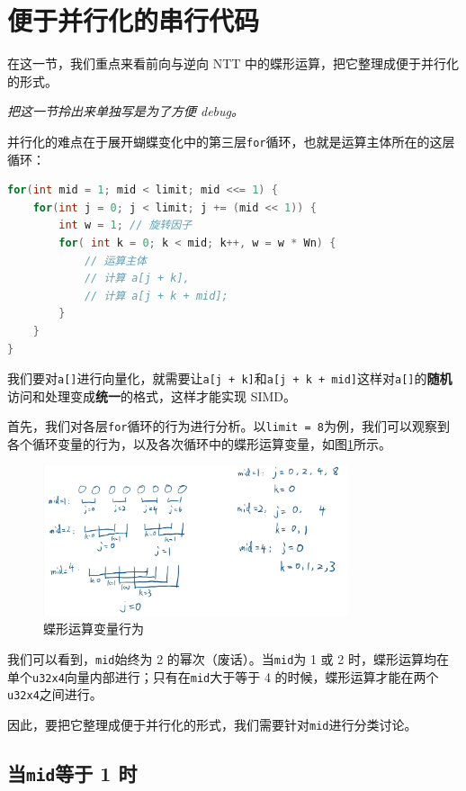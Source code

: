 \documentclass[a4paper]{article}
\begin{document}
\section{便于并行化的串行代码}

在这一节，我们重点来看前向与逆向 NTT 中的蝶形运算，把它整理成便于并行化的形式。

\textit{把这一节拎出来单独写是为了方便 debug。}

并行化的难点在于展开蝴蝶变化中的第三层\texttt{for}循环，也就是运算主体所在的这层循环：

\begin{lstlisting}[language=C++]
for(int mid = 1; mid < limit; mid <<= 1) {
    for(int j = 0; j < limit; j += (mid << 1)) {
        int w = 1; // 旋转因子
        for( int k = 0; k < mid; k++, w = w * Wn) {
            // 运算主体
            // 计算 a[j + k],
            // 计算 a[j + k + mid];
        }
    }
}
\end{lstlisting}

我们要对\texttt{a[]}进行向量化，就需要让\texttt{a[j + k]}和\texttt{a[j + k + mid]}这样对\texttt{a[]}的\textbf{随机}访问和处理变成\textbf{统一}的格式，这样才能实现 SIMD。

首先，我们对各层\texttt{for}循环的行为进行分析。以\texttt{limit = 8}为例，我们可以观察到各个循环变量的行为，以及各次循环中的蝶形运算变量，如图\ref{p2}所示。

\begin{figure}[h]
    \centering
    \includegraphics[width=0.8\textwidth]{image/1.png}
    \caption{蝶形运算变量行为}
    \label{p2}
\end{figure}

我们可以看到，\texttt{mid}始终为 2 的幂次（废话）。当\texttt{mid}为 1 或 2 时，蝶形运算均在单个\texttt{u32x4}向量内部进行；只有在\texttt{mid}大于等于 4 的时候，蝶形运算才能在两个\texttt{u32x4}之间进行。

因此，要把它整理成便于并行化的形式，我们需要针对\texttt{mid}进行分类讨论。

\subsection{当\texttt{mid}等于 1 时}
\end{document}
